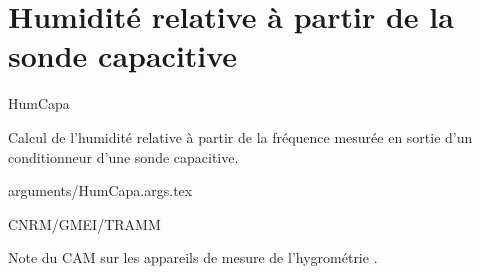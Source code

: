 %
\section{Humidit\'e relative \`a partir de la sonde capacitive}

 {\sf HumCapa}

Calcul de l'humidit\'e relative \`a partir de la fr\'equence
mesur\'ee en sortie d'un conditionneur d'une sonde capacitive.

\bigskip
 {arguments/HumCapa.args.tex}




CNRM/GMEI/TRAMM

Note du CAM sur les appareils de mesure de l'hygrom\'etrie \cite{CAM-hum}.
